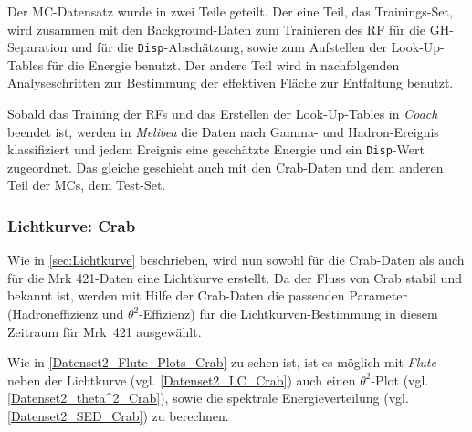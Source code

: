 Der MC-Datensatz wurde in zwei Teile geteilt.
Der eine Teil, das Trainings-Set, wird zusammen mit den Background-Daten zum Trainieren des RF für die GH-Separation und für die \texttt{Disp}-Abschätzung, sowie zum Aufstellen der Look-Up-Tables für die Energie benutzt.
Der andere Teil wird in nachfolgenden Analyseschritten zur Bestimmung der effektiven Fläche zur Entfaltung benutzt.

Sobald das Training der RFs und das Erstellen der Look-Up-Tables in \textit{Coach} beendet ist, werden in \textit{Melibea} die Daten nach Gamma- und Hadron-Ereignis klassifiziert und jedem Ereignis eine geschätzte Energie und ein \texttt{Disp}-Wert zugeordnet.
Das gleiche geschieht auch mit den Crab-Daten und dem anderen Teil der MCs, dem Test-Set.


\subsubsection{Lichtkurve: Crab}
Wie in \autoref{sec:Lichtkurve} beschrieben, wird nun sowohl für die Crab-Daten als auch für die Mrk 421-Daten eine Lichtkurve erstellt.
Da der Fluss von Crab stabil und bekannt ist, werden mit Hilfe der Crab-Daten die passenden Parameter (Hadroneffizienz und $\theta^2$-Effizienz) für die Lichtkurven-Bestimmung in diesem Zeitraum für Mrk~421 ausgewählt.

Wie in \autoref{Datenset2_Flute_Plots_Crab} zu sehen ist, ist es möglich mit \textit{Flute} neben der Lichtkurve (vgl. \autoref{Datenset2_LC_Crab}) auch einen $\theta^2$-Plot (vgl. \autoref{Datenset2_theta^2_Crab}), sowie die spektrale Energieverteilung (vgl. \autoref{Datenset2_SED_Crab}) zu berechnen.

